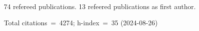 74 refereed publications. 13 refeered publications as first author.

Total citations~=~4274; h-index~=~35 (2024-08-26)